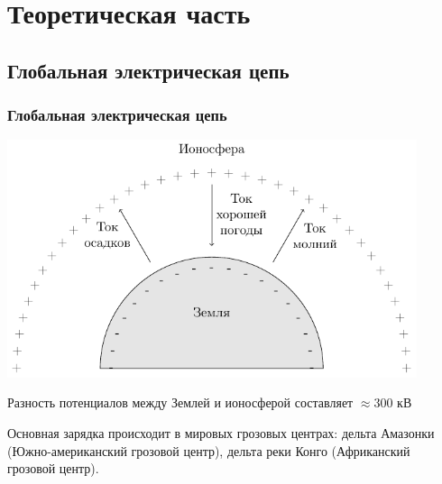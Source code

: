 \documentclass[10pt,pdf,hyperref={unicode}, dvipsnames]{beamer}
\newcommand\frametitless[1]{\subsection{#1}\frametitle{#1}}
\begin{document}
\section{Теоретическая часть}
\begin{frame}[t]
	\frametitless{Глобальная электрическая цепь}
	\vspace{-1em}
	\begin{center}
		\includegraphics[width=0.9\textwidth]{images/spont}
	\end{center}
	Разность потенциалов между Землей и ионосферой составляет $\approx 300$ кВ

	Основная зарядка происходит в мировых грозовых центрах: дельта Амазонки (Южно-американский грозовой центр), дельта реки Конго (Африканский грозовой центр).
\end{frame}
\end{document}
